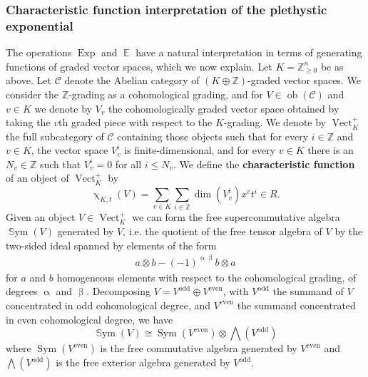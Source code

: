 \documentclass{amsart}
\DeclareMathOperator{\Vect}{Vect}
\DeclareMathOperator{\Sym}{\mathbb{S}ym}
\DeclareMathOperator{\CSym}{Sym}
\DeclareMathOperator{\even}{even}
\DeclareMathOperator{\odd}{odd}
\DeclareMathOperator{\EE}{\mathbb{E}}
\DeclareMathOperator{\ob}{ob}
\DeclareMathOperator{\Exp}{Exp}
\let\bb=\mathbb
\renewcommand{\alpha}{\upalpha}
\renewcommand{\beta}{\upbeta}
\renewcommand{\chi}{\upchi}
\theoremstyle{plain}%
\theoremstyle{definition}
\theoremstyle{remark}
\begin{document}
\subsubsection{Characteristic function interpretation of the plethystic exponential}

The operations $\Exp$ and $\EE$ have a natural interpretation in terms of generating functions of graded vector spaces, which we now explain.  Let $K=\mathbb{Z}_{\geq 0}^n$ be as above.  Let $\mathcal{C}$ denote the Abelian category of $(K\oplus \mathbb{Z})$-graded vector spaces.  We consider the $\mathbb{Z}$-grading as a cohomological grading, and for $V\in \ob(\mathcal{C})$ and $v\in K$ we denote by $V_v$ the cohomologically graded vector space obtained by taking the $v$th graded piece with respect to the $K$-grading.  We denote by $\Vect_{K}^+$ the full subcategory of $\mathcal{C}$ containing those objects such that for every $i\in \mathbb{Z}$ and $v\in K$, the vector space $V_v^i$ is finite-dimensional, and for every $v\in K$ there is an $N_v\in \bb{Z}$ such that $V_v^i=0$ for all $i\leq N_v$.  We define the \textbf{characteristic function} of an object of $\Vect_K^+$ by 
\begin{equation}
    \label{char_fn_def}
    \chi_{K,t}(V)=\sum_{v\in K}\sum_{i\in \mathbb{Z}}\dim(V_v^i)x^vt^i\in R.
\end{equation}
Given an object $V\in \Vect^+_K$ we can form the free supercommutative algebra $\Sym(V)$ generated by $V$, i.e. the quotient of the free tensor algebra of $V$ by the two-sided ideal spanned by elements of the form
\begin{align*}
    a\otimes b -(-1)^{\alpha \beta}b\otimes a
\end{align*}
for $a$ and $b$ homogeneous elements with respect to the cohomological grading, of degrees $\alpha$ and $\beta$.  Decomposing $V=V^{\odd}\oplus V^{\even}$, with $V^{\odd}$ the summand of $V$ concentrated in odd cohomological degree, and $V^{\even}$ the summand concentrated in even cohomological degree, we have
\[
\Sym(V)\cong\CSym(V^{\even})\otimes \bigwedge(V^{\odd})
\]
where $\CSym(V^{\even})$ is the free commutative algebra generated by $V^{\even}$ and $\bigwedge(V^{\odd})$ is the free exterior algebra generated by $V^{\odd}$.
\end{document}
